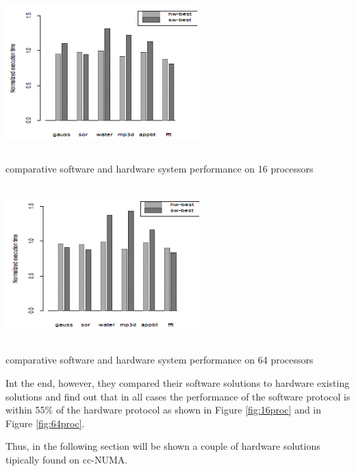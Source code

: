 \documentclass[a4paper,10pt]{article}
\makeatletter
\newenvironment{figurehere}{\def\@captype{figure}\vspace{2ex}}{\vspace{2ex}}
\makeatother
\begin{document}
\begin{multicols}{2}
\begin{figurehere}
 \centering
 \includegraphics[width=7.5cm, height=6cm]{./eps/result16proc.png}
 \caption{comparative software and hardware system performance on 16 processors}
 \label{fig:16proc}
\end{figurehere}


\begin{figurehere}
 \centering
 \includegraphics[width=7.5cm, height=6cm]{./eps/result64proc.png}
 \caption{comparative software and hardware system performance on 64 processors}
 \label{fig:64proc}
\end{figurehere}

Int the end, however, they compared their software solutions to hardware existing solutions and find out that in all cases the performance of the software protocol is within 55\% of the hardware protocol as shown in Figure \ref{fig:16proc} and in Figure \ref{fig:64proc}.\par
\parindent 10mm Thus, in the following section will be shown a couple of hardware solutions tipically found on cc-NUMA.


\end{multicols}
\end{document}
